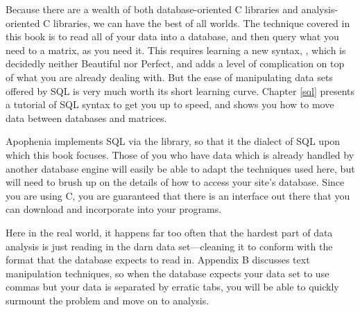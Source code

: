  Because there
are a wealth of both database-oriented C libraries and analysis-oriented C
libraries, we can have the best of all worlds. The technique covered
in this book is to read
all of your data into a database, and then query what you need to a
matrix, as you need it. This requires learning a new syntax, ,
which is decidedly neither Beautiful nor Perfect, and adds a level of
complication on top of what you are already dealing with. But the ease
of manipulating data sets offered by SQL is very much worth its short
learning curve. Chapter \ref{sql} presents a tutorial of SQL syntax to
get you up to speed, and shows you how to move data between databases
and matrices.

Apophenia implements SQL via the  library, so that it the
dialect of SQL upon which this book focuses.  Those of you
who have data which is already handled by another database engine will
easily be able to adapt the techniques used here, but will need to brush
up on the details of how to access your site's database. Since you are
using C, you are guaranteed that there is an interface out there that
you can download and incorporate into your programs.

Here in the real world, it happens far too often that the hardest
part of data analysis is just reading in the darn data set---cleaning
it to conform with the format that the database expects to read in.
Appendix B discusses text manipulation techniques,
so when the database expects your data set to use commas but your data
is separated by erratic tabs, you will be able to quickly surmount the
problem and move on to analysis.

